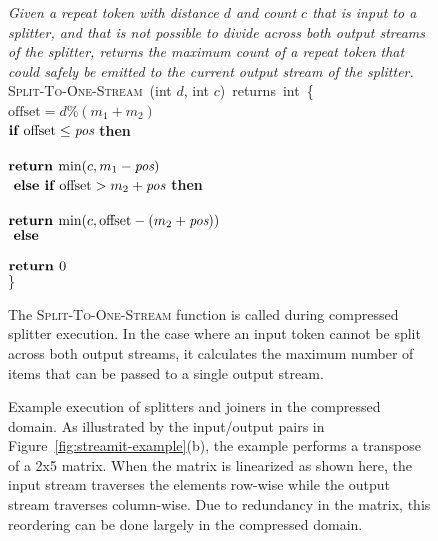 \begin{figure}[t!]
\centering
\begin{minipage}{0.76\textwidth}
{\it Given a repeat token with distance $d$ and count $c$ that is
  input to a splitter, and that is not possible to divide across both
  output streams of the splitter, returns the maximum count of a
  repeat token that could safely be emitted to the current output
  stream of the splitter.}\\
\textsc{Split-To-One-Stream}~(int $d$, int $c$)~returns~int~\{\\
 $\mbox{offset} = d$\%$(m_1 + m_2)$\\
\tab$\mbox{{\bf if~}} \mbox{offset} \leq \mbox{\it pos}$ {\bf then}\\
\tab{}\\
\tab\tab$\mbox{\bf return~} \mbox{min}(c, m_1 - \mbox{\it pos})$\\
\tab$\mbox{\bf ~else if~} \mbox{offset} > m_2 + \mbox{\it pos}$ {\bf then}\\
\tab{}\\
\tab\tab$\mbox{\bf return~} \mbox{min}(c, \mbox{offset} - (m_2 + \mbox{\it pos}))$\\
\tab$\mbox{\bf ~else}$\\
\tab{}\\
\tab\tab$\mbox{\bf return~} 0$\\
\}
\end{minipage}
\caption[\textsc{Split-To-One-Stream} function for compressed splitter
  execution]{The \textsc{Split-To-One-Stream} function is called during
  compressed splitter execution.  In the case where an input token
  cannot be split across both output streams, it calculates the
  maximum number of items that can be passed to a single output
  stream.\protect\label{fig:split-to-one-stream}}
\end{figure}

\begin{figure}[t!]
\caption[Example execution of splitters and joiners in the compressed
  domain]{Example execution of splitters and joiners in the compressed
  domain.  As illustrated by the input/output pairs in
  Figure~\ref{fig:streamit-example}(b), the example performs a
  transpose of a 2x5 matrix.  When the matrix is linearized as shown
  here, the input stream traverses the elements row-wise while the
  output stream traverses column-wise.  Due to redundancy in the
  matrix, this reordering can be done largely in the compressed
  domain.  \protect\label{fig:sj-example}}
\end{figure}

